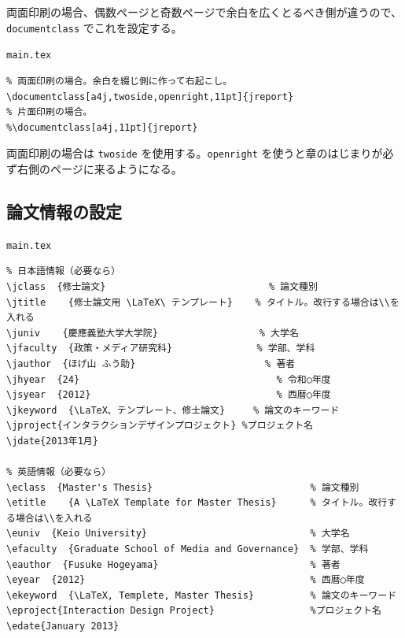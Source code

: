 両面印刷の場合、偶数ページと奇数ページで余白を広くとるべき側が違うので、\verb|documentclass| でこれを設定する。

\begin{itembox}[l]{{\tt main.tex}}
\begin{verbatim}
% 両面印刷の場合。余白を綴じ側に作って右起こし。
\documentclass[a4j,twoside,openright,11pt]{jreport}
% 片面印刷の場合。
%\documentclass[a4j,11pt]{jreport}
\end{verbatim}
\end{itembox}

両面印刷の場合は \verb|twoside| を使用する。\verb|openright| を使うと章のはじまりが必ず右側のページに来るようになる。

\subsection{論文情報の設定}
\label{sec:meta}

\begin{itembox}[l]{{\tt main.tex}}
\begin{verbatim}
% 日本語情報（必要なら）
\jclass  {修士論文}                             % 論文種別
\jtitle    {修士論文用 \LaTeX\ テンプレート}    % タイトル。改行する場合は\\を入れる
\juniv    {慶應義塾大学大学院}                  % 大学名
\jfaculty  {政策・メディア研究科}               % 学部、学科
\jauthor  {ほげ山 ふう助}                       % 著者
\jhyear  {24}                                   % 令和○年度
\jsyear  {2012}                                 % 西暦○年度
\jkeyword  {\LaTeX、テンプレート、修士論文}     % 論文のキーワード
\jproject{インタラクションデザインプロジェクト} %プロジェクト名
\jdate{2013年1月}

% 英語情報（必要なら）
\eclass  {Master's Thesis}                            % 論文種別
\etitle    {A \LaTeX Template for Master Thesis}      % タイトル。改行する場合は\\を入れる
\euniv  {Keio University}                             % 大学名
\efaculty  {Graduate School of Media and Governance}  % 学部、学科
\eauthor  {Fusuke Hogeyama}                           % 著者
\eyear  {2012}                                        % 西暦○年度
\ekeyword  {\LaTeX, Templete, Master Thesis}          % 論文のキーワード
\eproject{Interaction Design Project}                 %プロジェクト名
\edate{January 2013}
\end{verbatim}
\end{itembox}

